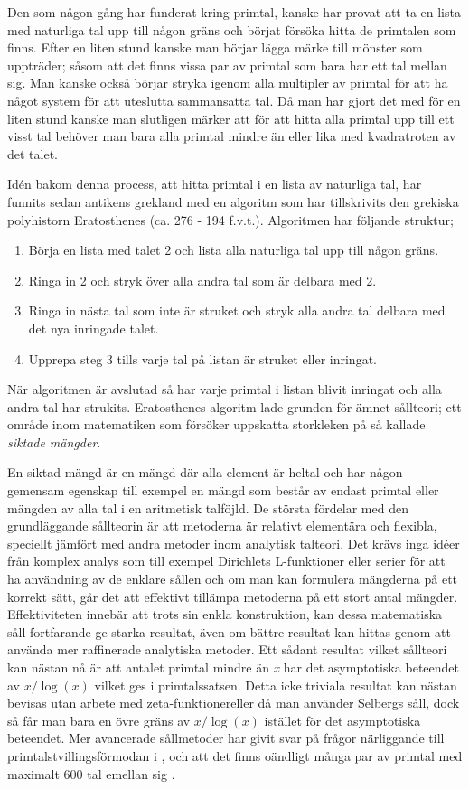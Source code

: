 Den som någon gång har funderat kring primtal, kanske har provat att ta en lista med naturliga tal upp till någon gräns och börjat försöka hitta de primtalen som finns. 
Efter en liten stund kanske man börjar lägga märke till mönster som uppträder; såsom att det finns vissa par av primtal som bara har ett tal mellan sig. 
Man kanske också börjar stryka igenom alla multipler av primtal för att ha något system för att uteslutta sammansatta tal.
Då man har gjort det med för en liten stund kanske man slutligen märker att för att hitta alla primtal upp till ett visst tal behöver man bara alla primtal mindre än eller lika med kvadratroten av det talet.

Idén bakom denna process, att hitta primtal i en lista av naturliga tal, har funnits sedan antikens grekland med en algoritm som har tillskrivits den grekiska polyhistorn Eratosthenes (ca. 276 - 194 f.v.t.). Algoritmen har följande struktur;
\begin{enumerate}
    \item Börja en lista med talet 2 och lista alla naturliga tal upp till någon gräns.
    \item Ringa in 2 och stryk över alla andra tal som är delbara med 2.
    \item Ringa in nästa tal som inte är struket och stryk alla andra tal delbara med det nya inringade talet.
    \item Upprepa steg 3 tills varje tal på listan är struket eller inringat. 
\end{enumerate}
När algoritmen är avslutad så har varje primtal i listan blivit inringat och alla andra tal har strukits. 
Eratosthenes algoritm lade grunden för ämnet sållteori; ett område inom matematiken som försöker uppskatta storkleken på så kallade \textit{siktade mängder}. 

En siktad mängd är en mängd där alla element är heltal och har någon gemensam egenskap till exempel en mängd som består av endast primtal eller mängden av alla tal i en aritmetisk talföjld.
De största fördelar med den grundläggande sållteorin är att metoderna är relativt elementära och flexibla, speciellt jämfört med andra metoder inom analytisk talteori. 
Det krävs inga idéer från komplex analys som till exempel Dirichlets L-funktioner eller serier för att ha användning av de enklare sållen och om man kan formulera mängderna på ett korrekt sätt, går det att effektivt tillämpa metoderna på ett stort antal mängder. 
Effektiviteten innebär att trots sin enkla konstruktion, kan dessa matematiska såll fortfarande ge starka resultat, även om bättre resultat kan hittas genom att använda mer raffinerade analytiska metoder.
Ett sådant resultat vilket sållteori kan nästan nå är att antalet primtal mindre än \textit{x} har det asymptotiska beteendet av \(x/\log(x)\) vilket ges i primtalssatsen. 
Detta icke triviala resultat kan nästan bevisas utan arbete med zeta-funktionereller då man använder Selbergs såll, dock så får man bara en övre gräns av \(x/\log(x)\) istället för det asymptotiska beteendet. 
Mer avancerade sållmetoder har givit svar på frågor närliggande till primtalstvillingsförmodan i \cite{chen2Prime}, och att det finns oändligt många par av primtal med maximalt 600 tal emellan sig \cite{mayBound}.


